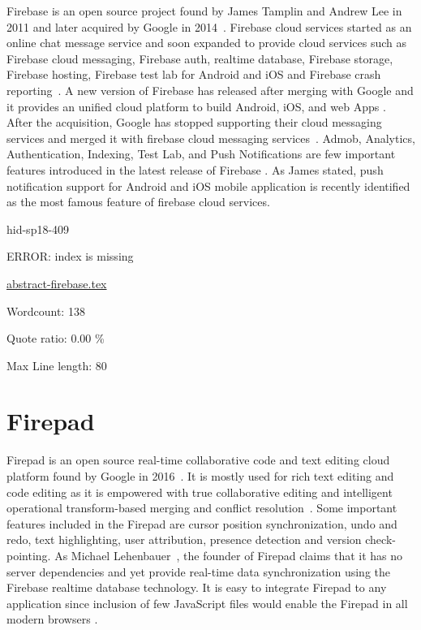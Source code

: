 Firebase is an open source project found by James Tamplin and Andrew Lee in 2011
and later acquired by Google in 2014~\cite{hid-sp18-409-www-firebase}. Firebase
cloud services started as an online chat message service and soon expanded to
provide cloud services such as Firebase cloud messaging, Firebase auth, realtime
database, Firebase storage, Firebase hosting, Firebase test lab for Android and
iOS and Firebase crash reporting~\cite{hid-sp18-409-www-firebase-official}. A
new version of Firebase has released after merging with Google and it provides
an unified cloud platform to build Android, iOS, and web Apps
\cite{hid-sp18-409-www-firebase-official}. After the acquisition, Google has
stopped supporting their cloud messaging services and merged it with firebase
cloud messaging services~\cite{hid-sp18-409-www-firebase-merged}. Admob,
Analytics, Authentication, Indexing, Test Lab, and Push Notifications are few
important features introduced in the latest release of Firebase
\cite{hid-sp18-409-www-firebase-official}. As James
\cite{hid-sp18-409-www-firebase} stated, push notification support for Android
and iOS mobile application is recently identified as the most famous feature of
firebase cloud services.


\begin{IU}

hid-sp18-409

ERROR: index is missing

\href{https://github.com/cloudmesh-community/hid-sp18-409/blob/master//technology/abstract-firebase.tex}{abstract-firebase.tex}

 

Wordcount: 138


Quote ratio: 0.00 \%
 
Max Line length: 80
\end{IU}

\section{Firepad}

Firepad is an open source real-time collaborative code and text editing cloud
platform found by Google in 2016~\cite{hid-sp18-409-www-firepad}.  It is mostly
used for rich text editing and code editing as it is empowered with true
collaborative editing and intelligent operational transform-based merging and
conflict resolution~\cite{hid-sp18-409-www-firepad-wikipedia}. Some important
features included in the Firepad are cursor position synchronization, undo and
redo, text highlighting, user attribution, presence detection and version
check-pointing. As Michael Lehenbauer~\cite{hid-sp18-409-www-firepad}, the
founder of Firepad claims that it has no server dependencies and yet provide
real-time data synchronization using the Firebase realtime database technology.
It is easy to integrate Firepad to any application since inclusion of few
JavaScript files would enable the Firepad in all modern browsers
\cite{hid-sp18-409-www-firepad}.


